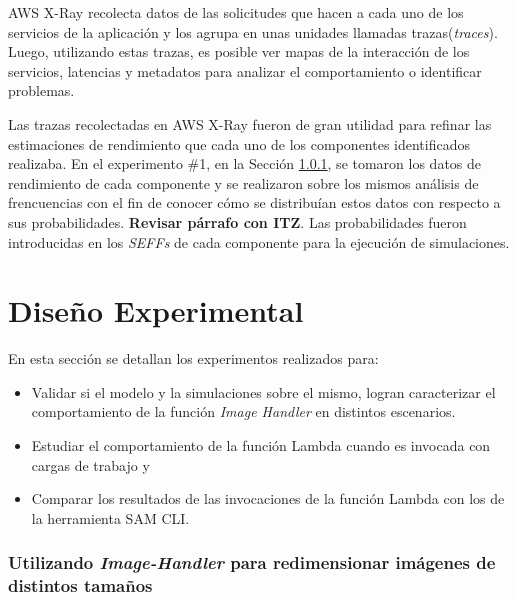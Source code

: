 AWS X-Ray recolecta datos de las solicitudes que hacen a cada uno de los servicios de la aplicación y los agrupa en unas unidades llamadas trazas(\emph{traces}). Luego, utilizando estas trazas, es posible ver mapas de la interacción de los servicios, latencias y metadatos para analizar el comportamiento o identificar problemas.


Las trazas recolectadas en AWS X-Ray fueron de gran utilidad para refinar las estimaciones de rendimiento que cada uno de los componentes identificados realizaba. En el experimento \#1, en la Sección \ref{sec:experimento-1}, se tomaron los datos de rendimiento de cada componente y se realizaron sobre los mismos análisis de frencuencias con el fin de conocer cómo se distribuían estos datos con respecto a sus probabilidades. \textbf{Revisar párrafo con ITZ}. Las probabilidades fueron introducidas en los \emph{SEFFs} de cada componente para la ejecución de simulaciones.   


\chapter{Diseño Experimental}
En esta sección se detallan los experimentos realizados para:
\begin{itemize}
    \item Validar si el modelo y la simulaciones sobre el mismo, logran caracterizar el comportamiento de la función \emph{Image Handler} en distintos escenarios. 
    \item Estudiar el comportamiento de la función Lambda cuando es invocada con cargas de trabajo y
    \item Comparar los resultados de las invocaciones de la función Lambda con los de la herramienta SAM CLI.
\end{itemize}

\subsection{Utilizando \emph{Image-Handler} para redimensionar imágenes de distintos tamaños} \label{sec:experimento-1}

